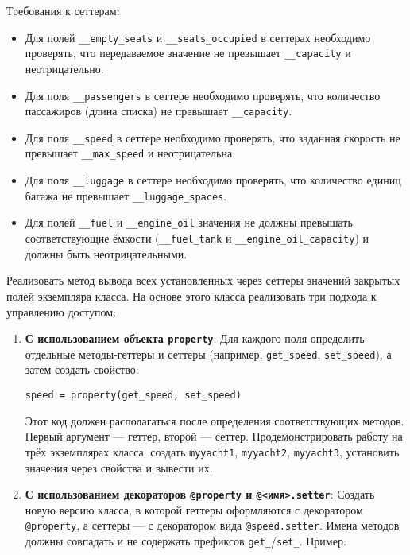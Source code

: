\begin{enumerate}
\begin{itemize}
\end{itemize}
Требования к сеттерам:
\begin{itemize}
    \item Для полей \texttt{\_\_empty\_seats} и \texttt{\_\_seats\_occupied} в сеттерах необходимо проверять, что передаваемое значение не превышает \texttt{\_\_capacity} и неотрицательно.  
    \item Для поля \texttt{\_\_passengers} в сеттере необходимо проверять, что количество пассажиров (длина списка) не превышает \texttt{\_\_capacity}.  
    \item Для поля \texttt{\_\_speed} в сеттере необходимо проверять, что заданная скорость не превышает \texttt{\_\_max\_speed} и неотрицательна.  
    \item Для поля \texttt{\_\_luggage} в сеттере необходимо проверять, что количество единиц багажа не превышает \texttt{\_\_luggage\_spaces}.
    \item Для полей \texttt{\_\_fuel} и \texttt{\_\_engine\_oil} значения не должны превышать соответствующие ёмкости (\texttt{\_\_fuel\_tank} и \texttt{\_\_engine\_oil\_capacity}) и должны быть неотрицательными.
\end{itemize}
Реализовать метод вывода всех установленных через сеттеры значений закрытых полей экземпляра класса.
На основе этого класса реализовать три подхода к управлению доступом:
\begin{enumerate}
    \item \textbf{С использованием объекта \texttt{property}}:  
    Для каждого поля определить отдельные методы-геттеры и сеттеры (например, \texttt{get\_speed}, \texttt{set\_speed}), а затем создать свойство:  
    \begin{verbatim}
speed = property(get_speed, set_speed)
    \end{verbatim}  
    Этот код должен располагаться после определения соответствующих методов. Первый аргумент — геттер, второй — сеттер.  
    Продемонстрировать работу на трёх экземплярах класса: создать \texttt{myyacht1}, \texttt{myyacht2}, \texttt{myyacht3}, установить значения через свойства и вывести их.
    \item \textbf{С использованием декораторов \texttt{@property} и \texttt{@<имя>.setter}}:  
    Создать новую версию класса, в которой геттеры оформляются с декоратором \texttt{@property}, а сеттеры — с декоратором вида \texttt{@speed.setter}. Имена методов должны совпадать и не содержать префиксов \texttt{get\_}/\texttt{set\_}.  
    Пример:  
    \begin{verbatim}

\end{verbatim}
\end{enumerate}
\end{enumerate}
